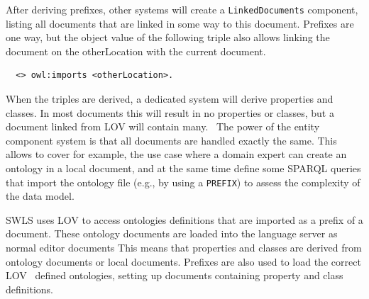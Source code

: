 After deriving prefixes, other systems will create a \texttt{LinkedDocuments} component, listing all documents that are linked in some way to this document.
Prefixes are one way, but the object value of the following triple also allows linking the document on the otherLocation with the current document.
\begin{verbatim}
  <> owl:imports <otherLocation>.
\end{verbatim} 

When the triples are derived, a dedicated system will derive properties and classes.
In most documents this will result in no properties or classes, but a document linked from LOV will contain many.~
The power of the entity component system is that all documents are handled exactly the same.
This allows to cover for example, the use case where a domain expert can create an ontology in a local document, and at the same time define some SPARQL queries that import the ontology file (e.g., by using a \texttt{PREFIX}) to assess the complexity of the data model.

SWLS uses LOV\cite{LOV2017} to access ontologies definitions that are imported as a prefix of a document.
These ontology documents are loaded into the language server as normal editor documents
This means that properties and classes are derived from ontology documents or local documents.
Prefixes are also used to load the correct LOV~\cite{LOV2017} defined ontologies, setting up documents containing property and class definitions.~

